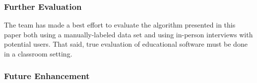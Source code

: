 \subsubsection{Further Evaluation}
\label{sec:further-evaluation}
The team has made a best effort to evaluate the algorithm presented in this
paper both using a manually-labeled data set and using in-person interviews with
potential users. That said, true evaluation of educational software must be done
in a classroom setting.  

\subsubsection{Future Enhancement}
\label{sec:future-enhancement}

